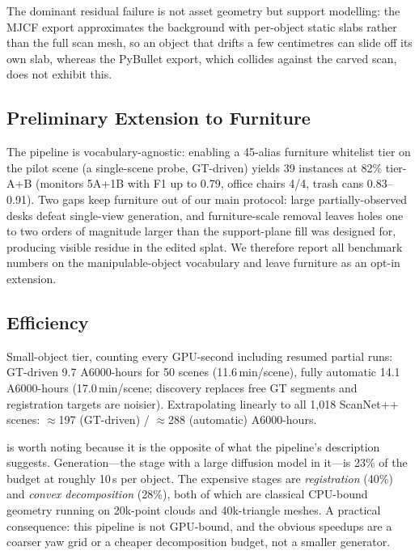 The dominant residual failure is not asset geometry but support modelling:
the MJCF export approximates the background with per-object static slabs
rather than the full scan mesh, so an object that drifts a few centimetres
can slide off its own slab, whereas the PyBullet export, which collides
against the carved scan, does not exhibit this.

\subsection{Preliminary Extension to Furniture}
\label{sec:furniture}
The pipeline is vocabulary-agnostic: enabling a 45-alias furniture
whitelist tier on the pilot scene (a single-scene probe, GT-driven)
yields 39 instances at 82\% tier-A+B (monitors 5A+1B with F1 up to
0.79, office chairs 4/4, trash cans 0.83--0.91).
Two gaps keep furniture out of our main protocol: large
partially-observed desks defeat single-view generation, and
furniture-scale removal leaves holes one to two orders of magnitude
larger than the support-plane fill was designed for, producing visible
residue in the edited splat. We therefore report all benchmark numbers
on the manipulable-object vocabulary and leave furniture as an opt-in
extension.

\subsection{Efficiency}
\ifextended
\begin{table}[t]
\caption{Where the 9.68 A6000-hours go (GT-driven, 50 scenes).}
\label{tab:timing}
\centering\small

\end{table}
\fi


Small-object tier, counting every GPU-second including resumed partial
runs: GT-driven 9.7 A6000-hours for 50 scenes (11.6\,min/scene), fully
automatic 14.1 A6000-hours (17.0\,min/scene; discovery replaces free GT
segments and registration targets are noisier). Extrapolating linearly to
all 1{,}018 ScanNet++ scenes: $\approx$197 (GT-driven) / $\approx$288
(automatic) A6000-hours.

is worth
noting because it is the opposite of what the pipeline's description
suggests. Generation---the stage with a large diffusion model in it---is
23\% of the budget at roughly 10\,s per object. The expensive stages are
\emph{registration} (40\%) and \emph{convex decomposition} (28\%), both of
which are classical CPU-bound geometry running on 20k-point clouds and
40k-triangle meshes. A practical consequence: this pipeline is not
GPU-bound, and the obvious speedups are a coarser yaw grid or a cheaper
decomposition budget, not a smaller generator.

